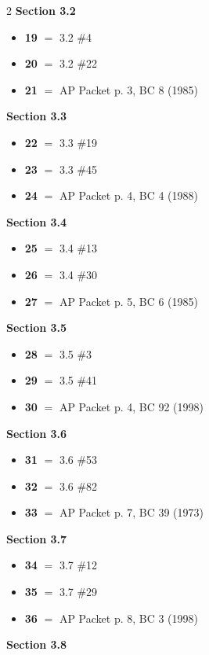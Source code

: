 \documentclass[11pt]{article}
\begin{document}
\begin{multicols}{2}
\smallskip
\noindent\textbf{Section 3.2}
\begin{itemize}[leftmargin=1.5em,itemsep=1pt,topsep=2pt]
\item[] \textbf{19} $=$ 3.2 \#4
\item[] \textbf{20} $=$ 3.2 \#22
\item[] \textbf{21} $=$ AP Packet p. 3, BC 8 (1985)
\end{itemize}
\smallskip
\noindent\textbf{Section 3.3}
\begin{itemize}[leftmargin=1.5em,itemsep=1pt,topsep=2pt]
\item[] \textbf{22} $=$ 3.3 \#19
\item[] \textbf{23} $=$ 3.3 \#45
\item[] \textbf{24} $=$ AP Packet p. 4, BC 4 (1988)
\end{itemize}
\smallskip
\noindent\textbf{Section 3.4}
\begin{itemize}[leftmargin=1.5em,itemsep=1pt,topsep=2pt]
\item[] \textbf{25} $=$ 3.4 \#13
\item[] \textbf{26} $=$ 3.4 \#30
\item[] \textbf{27} $=$ AP Packet p. 5, BC 6 (1985)
\end{itemize}
\smallskip
\noindent\textbf{Section 3.5}
\begin{itemize}[leftmargin=1.5em,itemsep=1pt,topsep=2pt]
\item[] \textbf{28} $=$ 3.5 \#3
\item[] \textbf{29} $=$ 3.5 \#41
\item[] \textbf{30} $=$ AP Packet p. 4, BC 92 (1998)
\end{itemize}
\smallskip
\noindent\textbf{Section 3.6}
\begin{itemize}[leftmargin=1.5em,itemsep=1pt,topsep=2pt]
\item[] \textbf{31} $=$ 3.6 \#53
\item[] \textbf{32} $=$ 3.6 \#82
\item[] \textbf{33} $=$ AP Packet p. 7, BC 39 (1973)
\end{itemize}
\smallskip
\noindent\textbf{Section 3.7}
\begin{itemize}[leftmargin=1.5em,itemsep=1pt,topsep=2pt]
\item[] \textbf{34} $=$ 3.7 \#12
\item[] \textbf{35} $=$ 3.7 \#29
\item[] \textbf{36} $=$ AP Packet p. 8, BC 3 (1998)
\end{itemize}
\smallskip
\noindent\textbf{Section 3.8}

\end{multicols}
\end{document}
